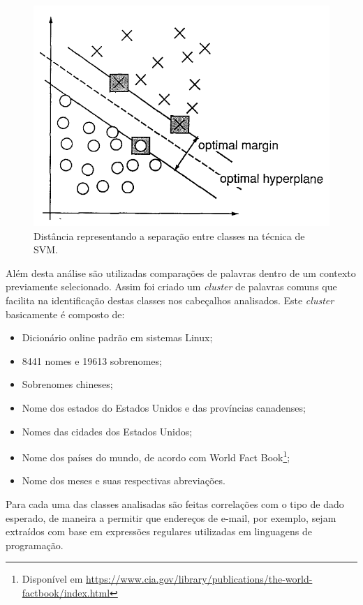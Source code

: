 \begin{figure}
	\centering
	\caption{Distância representando a separação entre classes na técnica de SVM.}
	\label{fig:svm-grafico}
	\includegraphics[width=0.6\linewidth]{./assets/svm-grafico}
\end{figure}

\begin{textoalterado}
Além desta análise são utilizadas comparações de palavras dentro de um contexto previamente selecionado. Assim foi criado um \textit{cluster} de palavras comuns que facilita na identificação destas classes nos cabeçalhos analisados. Este \textit{cluster} basicamente é composto de:
\end{textoalterado}

\begin{itemize}
\item Dicionário online padrão em sistemas Linux;
\item 8441 nomes e 19613 sobrenomes;
\item Sobrenomes chineses;
\item Nome dos estados do Estados Unidos e das províncias canadenses;
\item Nomes das cidades dos Estados Unidos;
\item Nome dos países do mundo, de acordo com World Fact Book\footnote{Disponível em \url{https://www.cia.gov/library/publications/the-world-factbook/index.html}};
\item Nome dos meses e suas respectivas abreviações.
\end{itemize}

Para cada uma das classes analisadas são feitas correlações com o tipo de dado esperado, de maneira a permitir que endereços de e-mail, por exemplo, sejam extraídos com base em expressões regulares utilizadas em linguagens de programação.

